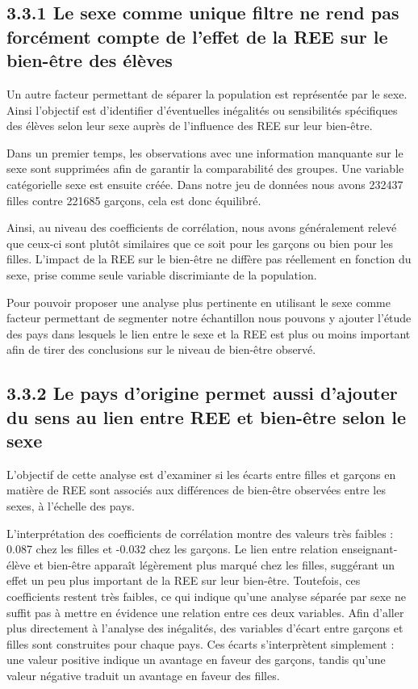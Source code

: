 \documentclass[
  french,
  11pt,
  a4paper,
  oneside]{report}
\begin{document}
\subsection{3.3.1 Le sexe comme unique filtre ne rend pas forcément
compte de l'effet de la REE sur le bien-être des
élèves}\label{le-sexe-comme-unique-filtre-ne-rend-pas-forcuxe9ment-compte-de-leffet-de-la-ree-sur-le-bien-uxeatre-des-uxe9luxe8ves}

Un autre facteur permettant de séparer la population est représentée par
le sexe. Ainsi l'objectif est d'identifier d'éventuelles inégalités ou
sensibilités spécifiques des élèves selon leur sexe auprès de
l'influence des REE sur leur bien-être.

Dans un premier temps, les observations avec une information manquante
sur le sexe sont supprimées afin de garantir la comparabilité des
groupes. Une variable catégorielle sexe est ensuite créée. Dans notre
jeu de données nous avons 232437 filles contre 221685 garçons, cela est
donc équilibré.

Ainsi, au niveau des coefficients de corrélation, nous avons
généralement relevé que ceux-ci sont plutôt similaires que ce soit pour
les garçons ou bien pour les filles. L'impact de la REE sur le bien-être
ne diffère pas réellement en fonction du sexe, prise comme seule
variable discrimiante de la population.

Pour pouvoir proposer une analyse plus pertinente en utilisant le sexe
comme facteur permettant de segmenter notre échantillon nous pouvons y
ajouter l'étude des pays dans lesquels le lien entre le sexe et la REE
est plus ou moins important afin de tirer des conclusions sur le niveau
de bien-être observé.

\subsection{3.3.2 Le pays d'origine permet aussi d'ajouter du sens au
lien entre REE et bien-être selon le
sexe}\label{le-pays-dorigine-permet-aussi-dajouter-du-sens-au-lien-entre-ree-et-bien-uxeatre-selon-le-sexe}

L'objectif de cette analyse est d'examiner si les écarts entre filles et
garçons en matière de REE sont associés aux différences de bien-être
observées entre les sexes, à l'échelle des pays.

L'interprétation des coefficients de corrélation montre des valeurs très
faibles : 0.087 chez les filles et -0.032 chez les garçons. Le lien
entre relation enseignant-élève et bien-être apparaît légèrement plus
marqué chez les filles, suggérant un effet un peu plus important de la
REE sur leur bien-être. Toutefois, ces coefficients restent très
faibles, ce qui indique qu'une analyse séparée par sexe ne suffit pas à
mettre en évidence une relation entre ces deux variables. Afin d'aller
plus directement à l'analyse des inégalités, des variables d'écart entre
garçons et filles sont construites pour chaque pays. Ces écarts
s'interprètent simplement : une valeur positive indique un avantage en
faveur des garçons, tandis qu'une valeur négative traduit un avantage en
faveur des filles.
\end{document}
